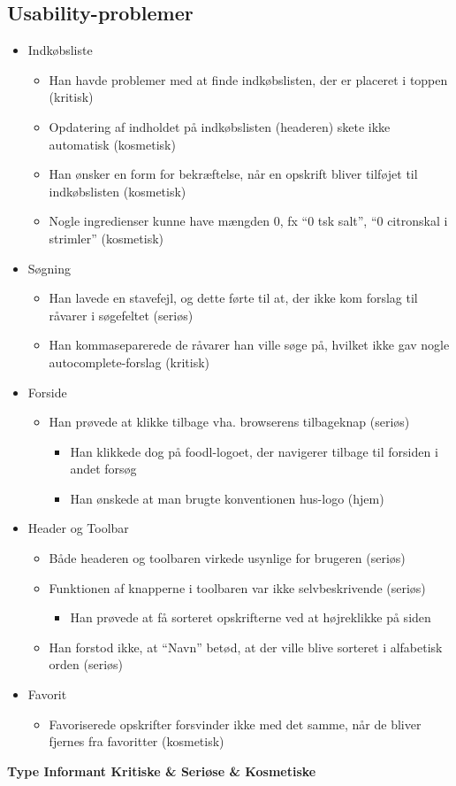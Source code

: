 \subsection{Usability-problemer}
 \begin{itemize}
 \item Indkøbsliste
  \begin{itemize}
  \item Han havde problemer med at finde indkøbslisten, der er placeret i toppen (kritisk)
  \item Opdatering af indholdet på indkøbslisten (headeren) skete ikke automatisk (kosmetisk)
  \item Han ønsker en form for bekræftelse, når en opskrift bliver tilføjet til indkøbslisten (kosmetisk)
  \item Nogle ingredienser kunne have mængden 0, fx “0 tsk salt”, “0 citronskal i strimler” (kosmetisk)
  \end{itemize}
 \item Søgning
  \begin{itemize}
  \item Han lavede en stavefejl, og dette førte til at, der ikke kom forslag til råvarer i søgefeltet (seriøs)
  \item Han kommaseparerede de råvarer han ville søge på, hvilket ikke gav nogle autocomplete-forslag (kritisk)
  \end{itemize}
 \item Forside
  \begin{itemize}
  \item Han prøvede at klikke tilbage vha. browserens tilbageknap (seriøs)
   \begin{itemize}
   \item Han klikkede dog på foodl-logoet, der navigerer tilbage til forsiden i andet forsøg 
   \item Han ønskede at man brugte konventionen hus-logo (hjem)
   \end{itemize}
  \end{itemize}
 \item Header og Toolbar
  \begin{itemize}
  \item Både headeren og toolbaren virkede usynlige for brugeren (seriøs)
  \item Funktionen af knapperne i toolbaren var ikke selvbeskrivende (seriøs)
   \begin{itemize}
   \item Han prøvede at få sorteret opskrifterne ved at højreklikke på siden
   \end{itemize}
  \item Han forstod ikke, at “Navn” betød, at der ville blive sorteret i alfabetisk orden (seriøs)
  \end{itemize}
 \item Favorit
  \begin{itemize}
  \item Favoriserede opskrifter forsvinder ikke med det samme, når de bliver fjernes fra favoritter (kosmetisk)
  \end{itemize}
\end{itemize}


\textbf{
           						 {Type}
       {Informant             	}{Kritiske   & Seriøse   & Kosmetiske}{
}
}